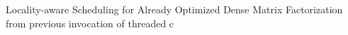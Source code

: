 \begin{frame}[label=ladmf]{Locality-aware Scheduling for Already Optimized Dense Matrix Factorization}
 from previous invocation of threaded c
\end{frame}

